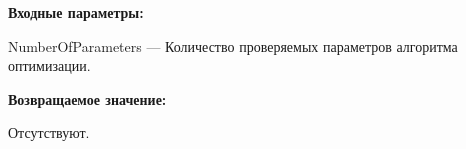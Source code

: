 \textbf{Входные параметры:}

NumberOfParameters --- Количество проверяемых параметров алгоритма оптимизации.

\textbf{Возвращаемое значение:}

Отсутствуют.